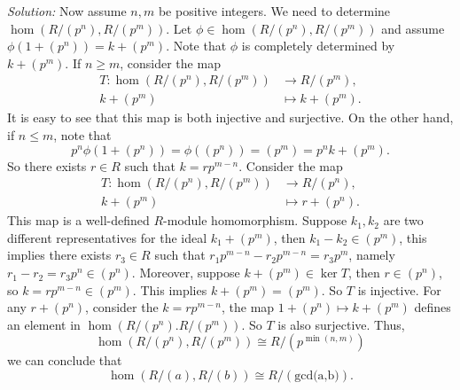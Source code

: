 \documentclass[a4paper, 12pt]{article}
\newenvironment{solution}
    {\textit{Solution:}}
    {}
\begin{document}
\begin{solution}
Now assume \(n,m\) be positive integers. We need to determine \(\hom (R/(p^n),R/(p^m))\). Let \(\phi\in \hom(R/(p^n),R/(p^m))\) and assume \(\phi(1+(p^n))=k+(p^m)\). Note that \(\phi\) is completely determined by \(k+(p^m)\). 
If \(n\geq m\), consider the map 
\begin{align*}
	T:\hom (R/(p^n),R/(p^m))&\rightarrow R/(p^m),\\ 
	                    k+(p^m)&\mapsto k+(p^m). 
\end{align*}
It is easy to see that this map is both injective and surjective. On the other hand, if \(n\leq m\), note that 
\[p^n\phi(1+(p^n))=\phi((p^n))=(p^m)=p^nk+(p^m).\]
So there exists \(r\in R\) such that \(k=rp^{m-n}\). 
Consider the map 
\begin{align*}
	T:\hom (R/(p^n),R/(p^m))&\rightarrow R/(p^n),\\ 
	                    k+(p^m)&\mapsto r+(p^n).
\end{align*}
This map is a well-defined \(R\)-module homomorphism. Suppose \(k_1,k_2\) are two different representatives for the ideal \(k_1+(p^m)\), then \(k_1-k_2\in (p^m)\), this implies there exists \(r_3\in R\) such that 
\(r_1p^{m-n}-r_2p^{m-n}=r_3p^m\), namely \(r_1-r_2=r_3p^n\in (p^n)\). Moreover, suppose \(k+(p^m)\in \ker T\), then \(r\in (p^n)\), so \(k=rp^{m-n}\in (p^m)\). This implies \(k+(p^m)=(p^m)\). So \(T\) is injective. For 
any \(r+(p^n)\), consider the \(k=rp^{m-n}\), the map \(1+(p^n)\mapsto k+(p^m)\) defines an element in \(\hom (R/(p^n).R/(p^m))\). So \(T\) is also surjective. Thus, 
\[\hom(R/(p^n),R/(p^m))\cong R/(p^{\min(n,m) })\]
we can conclude that 
\[\hom(R/(a),R/(b))\cong R/(\text{gcd(a,b)}).\]
\end{solution}
\end{document}
